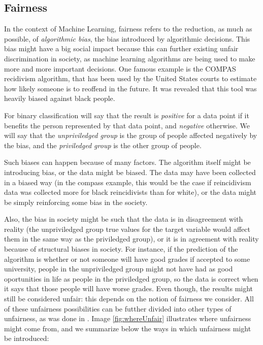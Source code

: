 \subsection{Fairness}

In the context of Machine Learning, fairness refers to the reduction, as much as possible, of \emph{algorithmic bias}, the bias introduced by algorithmic decisions. This bias might have a big social impact because this can further existing unfair discrimination in society, as machine learning algorithms are being used to make more and more important decisions. One famous example is the COMPAS recidivism algorithm, that has been used by the United States courts to estimate how likely someone is to reoffend in the future. It was revealed \cite{Compass} that this tool was heavily biased against black people. 

For binary classification will say that the result is \emph{positive} for a data point if it benefits the person represented by that data point, and \emph{negative} otherwise. We will say that the \emph{unpriviledged group} is the group of people affected negatively by the bias, and the \emph{priviledged group} is the other group of people.

Such biases can happen because of many factors. The algorithm itself might be introducing bias, or the data might be biased. The data may have been collected in a biased way (in the compass example, this would be the case if reincidivism data was collected more for black reincidivists than for white), or the data might be simply reinforcing some bias in the society. 

Also, the bias in society might be such that the data is in disagreement with reality (the unpriviledged group true values for the target variable would affect them in the same way as the priviledged group), or it is in agreement with reality because of structural biases in society. For instance, if the prediction of the algorithm is whether or not someone will have good grades if accepted to some university, people in the unpriviledged group might not have had as good oportunities in life as people in the priviledged group, so the data is correct when it says that those people will have worse grades. Even though, the results might still be considered unfair: this depends on the notion of fairness we consider. All of these unfairness possibilities can be futther divided into other types of unfairness, as was done in \cite{mehrabi2021survey}. Image \ref{fig:whereUnfair} illustrates where unfairness might come from, and we summarize below the ways in which unfairness might be introduced:

